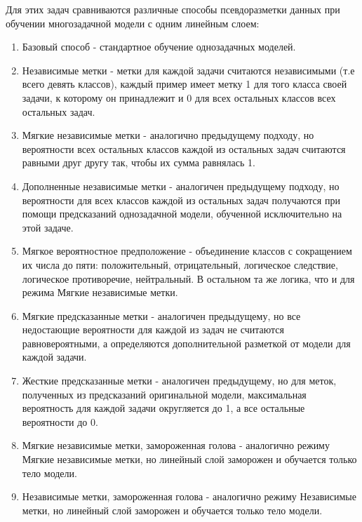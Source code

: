 Для этих задач сравниваются различные способы псевдоразметки данных при обучении многозадачной модели с одним линейным слоем:
\begin{enumerate}
\item Базовый способ - стандартное обучение однозадачных моделей.
\item Независимые метки - метки для каждой задачи считаются независимыми (т.е всего девять классов), каждый пример имеет метку 1 для того класса своей задачи, к которому он принадлежит и 0 для всех остальных классов всех остальных задач. 
\item Мягкие независимые метки - аналогично предыдущему подходу, но вероятности всех остальных классов каждой из остальных задач считаются равными друг другу так, чтобы их сумма равнялась 1. 
\item Дополненные независимые метки - аналогичен предыдущему подходу, но вероятности для всех классов каждой из остальных задач получаются при помощи предсказаний однозадачной модели, обученной исключительно на этой задаче.
\item Мягкое вероятностное предположение - объединение классов с сокращением их числа до пяти: положительный, отрицательный, логическое следствие, логическое противоречие, нейтральный. В остальном та же логика, что и для режима Мягкие независимые метки.
\item Мягкие предсказанные метки - аналогичен предыдущему, но все недостающие вероятности для каждой из задач не считаются равновероятными, а определяются дополнительной разметкой от модели для каждой задачи. 
\item Жесткие предсказанные метки - аналогичен предыдущему, но для меток, полученных из предсказаний оригинальной модели, максимальная вероятность для каждой задачи округляется до 1, а все остальные вероятности до 0.
\item Мягкие независимые метки, замороженная голова - аналогично режиму Мягкие независимые метки, но линейный слой заморожен и обучается только тело модели.
\item Независимые метки, замороженная голова - аналогично режиму Независимые метки, но линейный слой заморожен и обучается только тело модели.
\end{enumerate}

